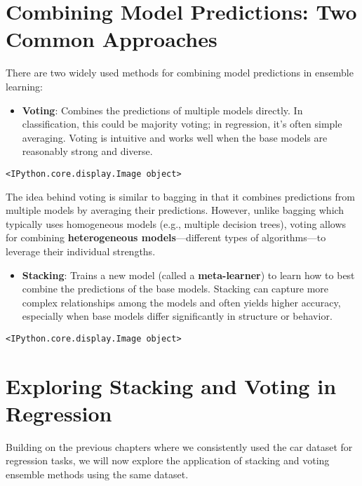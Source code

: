 \documentclass[
  letterpaper,
  DIV=11,
  numbers=noendperiod]{scrreprt}
\providecommand{\tightlist}{%
  \setlength{\itemsep}{0pt}\setlength{\parskip}{0pt}}\usepackage{longtable,booktabs,array}
\begin{document}
\section{Combining Model Predictions: Two Common
Approaches}\label{combining-model-predictions-two-common-approaches}

There are two widely used methods for combining model predictions in
ensemble learning:

\begin{itemize}
\tightlist
\item
  \textbf{Voting}: Combines the predictions of multiple models directly.
  In classification, this could be majority voting; in regression, it's
  often simple averaging. Voting is intuitive and works well when the
  base models are reasonably strong and diverse.
\end{itemize}

\begin{verbatim}
<IPython.core.display.Image object>
\end{verbatim}

The idea behind voting is similar to bagging in that it combines
predictions from multiple models by averaging their predictions.
However, unlike bagging which typically uses homogeneous models (e.g.,
multiple decision trees), voting allows for combining
\textbf{heterogeneous models}---different types of algorithms---to
leverage their individual strengths.

\begin{itemize}
\tightlist
\item
  \textbf{Stacking}: Trains a new model (called a \textbf{meta-learner})
  to learn how to best combine the predictions of the base models.
  Stacking can capture more complex relationships among the models and
  often yields higher accuracy, especially when base models differ
  significantly in structure or behavior.
\end{itemize}

\begin{verbatim}
<IPython.core.display.Image object>
\end{verbatim}

\section{Exploring Stacking and Voting in
Regression}\label{exploring-stacking-and-voting-in-regression}

Building on the previous chapters where we consistently used the car
dataset for regression tasks, we will now explore the application of
stacking and voting ensemble methods using the same dataset.
\end{document}
